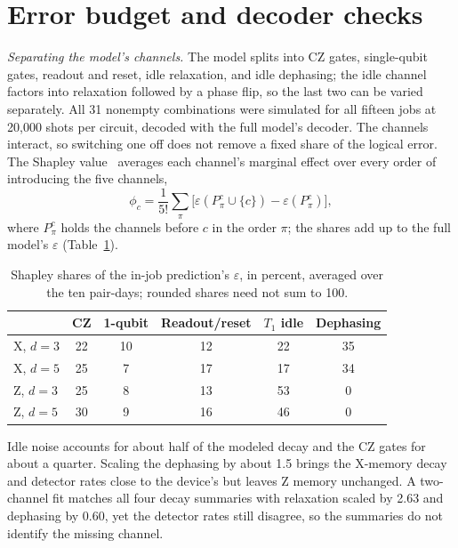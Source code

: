 \documentclass[aps,pra,reprint,nofootinbib,longbibliography,floatfix]{revtex4-2}
\newcommand{\eps}{\varepsilon}
\begin{document}
\section{Error budget and decoder checks}
\label{sec:budget}

\textit{Separating the model's channels.}
The model splits into CZ gates, single-qubit gates, readout and reset, idle relaxation, and idle dephasing; the idle channel factors into relaxation followed by a phase flip, so the last two can be varied separately.
All 31 nonempty combinations were simulated for all fifteen jobs at 20{,}000 shots per circuit, decoded with the full model's decoder.
The channels interact, so switching one off does not remove a fixed share of the logical error.
The Shapley value~\cite{shapley1953value} averages each channel's marginal effect over every order of introducing the five channels,
\begin{equation}
\phi_c = \frac{1}{5!}\sum_{\pi}\big[\eps(P^c_\pi \cup \{c\}) - \eps(P^c_\pi)\big],
\label{eq:shapley}
\end{equation}
where $P^c_\pi$ holds the channels before $c$ in the order $\pi$; the shares add up to the full model's $\eps$ (Table~\ref{tab:shapley}).

\begin{table}[b]
\caption{Shapley shares of the in-job prediction's $\eps$, in percent, averaged over the ten pair-days; rounded shares need not sum to 100.}
\label{tab:shapley}
\begin{ruledtabular}
\begin{tabular}{lccccc}
 & CZ & 1-qubit & Readout/reset & $T_1$ idle & Dephasing \\
\hline
X, $d=3$ & 22 & 10 & 12 & 22 & 35 \\
X, $d=5$ & 25 & 7 & 17 & 17 & 34 \\
Z, $d=3$ & 25 & 8 & 13 & 53 & 0 \\
Z, $d=5$ & 30 & 9 & 16 & 46 & 0 \\
\end{tabular}
\end{ruledtabular}
\end{table}

Idle noise accounts for about half of the modeled decay and the CZ gates for about a quarter.
Scaling the dephasing by about 1.5 brings the X-memory decay and detector rates close to the device's but leaves Z memory unchanged.
A two-channel fit matches all four decay summaries with relaxation scaled by 2.63 and dephasing by 0.60, yet the detector rates still disagree, so the summaries do not identify the missing channel.
\end{document}

